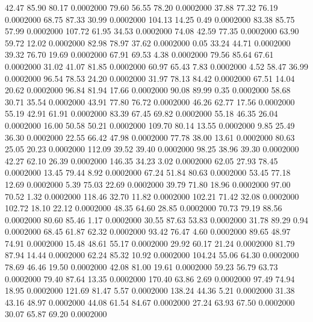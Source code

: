   42.47   85.90   80.17   0.0002000
  79.60   56.55   78.20   0.0002000
  37.88   77.32   76.19   0.0002000
  68.75   87.33   30.99   0.0002000
 104.13   14.25    0.49   0.0002000
  83.38   85.75   57.99   0.0002000
 107.72   61.95   34.53   0.0002000
  74.08   42.59   77.35   0.0002000
  63.90   59.72   12.02   0.0002000
  82.98   78.97   37.62   0.0002000
   0.05   33.24   44.71   0.0002000
  39.32   76.70   19.69   0.0002000
  67.91   69.53    4.38   0.0002000
  79.56   85.64   67.61   0.0002000
  31.02   41.07   81.85   0.0002000
  60.97   65.43    7.83   0.0002000
   4.52   58.47   36.99   0.0002000
  96.54   78.53   24.20   0.0002000
  31.97   78.13   84.42   0.0002000
  67.51   14.04   20.62   0.0002000
  96.84   81.94   17.66   0.0002000
  90.08   89.99    0.35   0.0002000
  58.68   30.71   35.54   0.0002000
  43.91   77.80   76.72   0.0002000
  46.26   62.77   17.56   0.0002000
  55.19   42.91   61.91   0.0002000
  83.39   67.45   69.82   0.0002000
  55.18   46.35   26.04   0.0002000
  16.00   50.58   50.21   0.0002000
 109.70   80.14   13.55   0.0002000
   9.85   25.49   36.30   0.0002000
  22.55   66.42   47.98   0.0002000
  77.78   38.00   13.61   0.0002000
  80.63   25.05   20.23   0.0002000
 112.09   39.52   39.40   0.0002000
  98.25   38.96   39.30   0.0002000
  42.27   62.10   26.39   0.0002000
 146.35   34.23    3.02   0.0002000
  62.05   27.93   78.45   0.0002000
  13.45   79.44    8.92   0.0002000
  67.24   51.84   80.63   0.0002000
  53.45   77.18   12.69   0.0002000
   5.39   75.03   22.69   0.0002000
  39.79   71.80   18.96   0.0002000
  97.00   70.52    1.32   0.0002000
 118.46   32.70   11.82   0.0002000
 102.21   71.42   32.08   0.0002000
 102.72   18.10   22.12   0.0002000
  48.35   64.60   28.85   0.0002000
  70.73   79.19   88.56   0.0002000
  80.60   85.46    1.17   0.0002000
  30.55   87.63   53.83   0.0002000
  31.78   89.29    0.94   0.0002000
  68.45   61.87   62.32   0.0002000
  93.42   76.47    4.60   0.0002000
  89.65   48.97   74.91   0.0002000
  15.48   48.61   55.17   0.0002000
  29.92   60.17   21.24   0.0002000
  81.79   87.94   14.44   0.0002000
  62.24   85.32   10.92   0.0002000
 104.24   55.06   64.30   0.0002000
  78.69   46.46   19.50   0.0002000
  42.08   81.00   19.61   0.0002000
  59.23   56.79   63.73   0.0002000
  79.40   87.64   13.35   0.0002000
 170.40   63.86    2.69   0.0002000
  97.49   74.94   18.95   0.0002000
 121.69   81.47    5.57   0.0002000
 138.24   44.36    5.21   0.0002000
  31.38   43.16   48.97   0.0002000
  44.08   61.54   84.67   0.0002000
  27.24   63.93   67.50   0.0002000
  30.07   65.87   69.20   0.0002000
